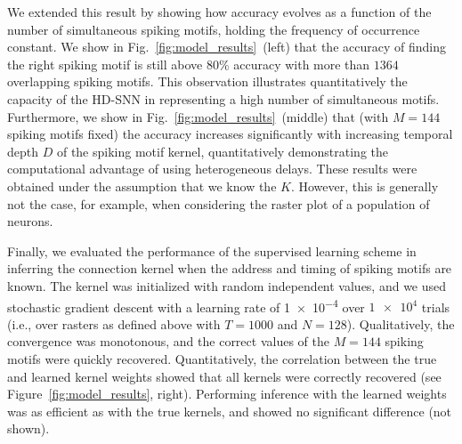 \documentclass[runningheads]{llncs}
\newcommand{\kernel}{K} %
\newcommand{\fig}[1]{Fig.~\ref{fig:#1}}%
\begin{document}
We extended this result by showing how accuracy evolves as a function of the number of simultaneous spiking motifs, holding the frequency of occurrence constant. We show in \fig{model_results}~(left) that the accuracy of finding the right spiking motif is still above $80\%$ accuracy with more than $1364$ overlapping spiking motifs. This observation illustrates quantitatively the capacity  of the HD-SNN in representing a high number of simultaneous motifs. Furthermore, we show in \fig{model_results}~(middle) that (with $M=144$ spiking motifs fixed) the accuracy increases significantly with increasing temporal depth $D$ of the spiking motif kernel, quantitatively demonstrating the computational advantage of using heterogeneous delays. These results were obtained under the assumption that we know the $\kernel$. However, this is generally not the case, for example, when considering the raster plot of a population of neurons.

Finally, we evaluated the performance of the supervised learning scheme in inferring the connection kernel when the address and timing of spiking motifs are known. The kernel was initialized with random independent values, and we used stochastic gradient descent with a learning rate of \num{1e-4} over $\num{1e4}$ trials (i.e., over rasters as defined above with $T=1000$ and $N=128$). Qualitatively, the convergence was monotonous, and the correct values of the $M=144$ spiking motifs were quickly recovered. Quantitatively, the correlation between the true and learned kernel weights showed that all kernels were correctly recovered (see Figure~\ref{fig:model_results}, right). Performing inference with the learned weights was as efficient as with the true kernels, and showed no significant difference (not shown).

\end{document}
